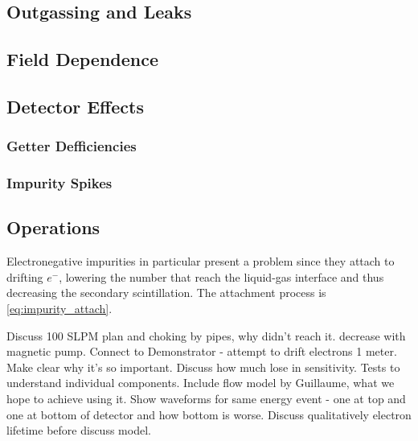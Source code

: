\subsection{Outgassing and Leaks}
\label{subsec:electron_lifetime_model_outgassing}



\subsection{Field Dependence}
\label{subsec:electron_lifetime_model_field}



\subsection{Detector Effects}
\label{subsec:electron_lifetime_model_detector_effects}



\subsubsection{Getter Defficiencies}
\label{subsubsec:electron_lifetime_model_detector_effects_getter}



\subsubsection{Impurity Spikes}
\label{subsubsec:electron_lifetime_model_detector_effects_spikes}



\subsection{Operations}
\label{subsec:electron_lifetime_model_ops}

Electronegative impurities
in particular present a problem
since they attach to drifting $e^{-}$,
lowering the number that reach the liquid-gas interface and thus decreasing the secondary scintillation.  The attachment process
is \eqref{eq:impurity_attach}.

Discuss 100 SLPM plan and choking by pipes, why didn't reach it.   decrease with magnetic
pump.  Connect to Demonstrator - attempt to drift electrons 1 meter.  Make clear why it's so important.  Discuss how much lose in
sensitivity.  Tests to understand individual components.  Include flow model by Guillaume, what we hope to achieve using it.  Show
waveforms for same energy event - one at top and one at bottom of detector and how bottom is worse.  Discuss qualitatively electron
lifetime before discuss model.

